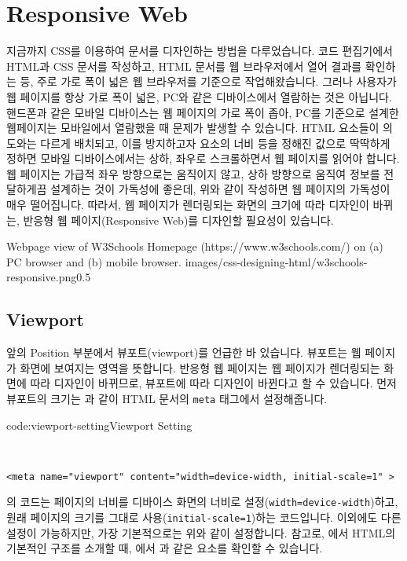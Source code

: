 \section{Responsive Web} \label{sect:responsive-web}

지금까지 CSS를 이용하여 문서를 디자인하는 방법을 다루었습니다. 코드 편집기에서 HTML과 CSS 문서를 작성하고, HTML 문서를 웹 브라우저에서 열어 결과를 확인하는 등, 주로 가로 폭이 넓은 웹 브라우저를 기준으로 작업해왔습니다. 그러나 사용자가 웹 페이지를 항상 가로 폭이 넓은, PC와 같은 디바이스에서 열람하는 것은 아닙니다. 핸드폰과 같은 모바일 디바이스는 웹 페이지의 가로 폭이 좁아, PC를 기준으로 설계한 웹페이지는 모바일에서 열람했을 때 문제가 발생할 수 있습니다. HTML 요소들이 의도와는 다르게 배치되고, 이를 방지하고자 요소의 너비 등을 정해진 값으로 딱딱하게 정하면 모바일 디바이스에서는 상하, 좌우로 스크롤하면서 웹 페이지를 읽어야 합니다. 웹 페이지는 가급적 좌우 방향으로는 움직이지 않고, 상하 방향으로 움직여 정보를 전달하게끔 설계하는 것이 가독성에 좋은데, 위와 같이 작성하면 웹 페이지의 가독성이 매우 떨어집니다. 따라서, 웹 페이지가 렌더링되는 화면의 크기에 따라 디자인이 바뀌는, 반응형 웹 페이지(Responsive Web)를 디자인할 필요성이 있습니다.

    {Webpage view of W3Schools Homepage (https://www.w3schools.com/) on (a) PC browser and (b) mobile browser.}
    {images/css-designing-html/w3schools-responsive.png}{0.5}

\subsection*{Viewport}
앞의  Position 부분에서 뷰포트(viewport)를 언급한 바 있습니다. 뷰포트는 웹 페이지가 화면에 보여지는 영역을 뜻합니다. 반응형 웹 페이지는 웹 페이지가 렌더링되는 화면에 따라 디자인이 바뀌므로, 뷰포트에 따라 디자인이 바뀐다고 할 수 있습니다. 먼저 뷰포트의 크기는 과 같이 HTML 문서의 \texttt{meta} 태그에서 설정해줍니다. 

\begin{codeenv}{code:viewport-setting}{Viewport Setting}\begin{verbatim}


<meta name="viewport" content="width=device-width, initial-scale=1" >
\end{verbatim}
\end{codeenv}

의 코드는 페이지의 너비를 디바이스 화면의 너비로 설정(\texttt{width=device-width})하고, 원래 페이지의 크기를 그대로 사용(\texttt{initial-scale=1})하는 코드입니다. 이외에도 다른 설정이 가능하지만, 가장 기본적으로는 위와 같이 설정합니다. 참고로, 에서 HTML의 기본적인 구조를 소개할 때, 에서 과 같은 요소를 확인할 수 있습니다.

